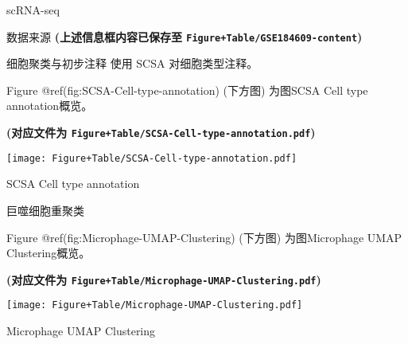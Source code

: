 \documentclass[
  ignorenonframetext,
]{beamer}
\begin{document}
\begin{frame}[fragile]{scRNA-seq}
\begin{block}{数据来源}
\textbf{(上述信息框内容已保存至
\texttt{Figure+Table/GSE184609-content})}
\end{block}

\begin{block}{细胞聚类与初步注释}
\protect\hypertarget{ux7ec6ux80deux805aux7c7bux4e0eux521dux6b65ux6ce8ux91ca}{}
使用 SCSA 对细胞类型注释。

\begin{center}\vspace{1.5cm}\end{center}

Figure @ref(fig:SCSA-Cell-type-annotation) (下方图) 为图SCSA Cell type
annotation概览。

\textbf{(对应文件为
\texttt{Figure+Table/SCSA-Cell-type-annotation.pdf})}

\def\@captype{figure}
\begin{center}
\texttt{[image: Figure+Table/SCSA-Cell-type-annotation.pdf]}
\caption{SCSA Cell type annotation}\label{fig:SCSA-Cell-type-annotation}
\end{center}

\begin{center}\vspace{1.5cm}\end{center}
\end{block}

\begin{block}{巨噬细胞重聚类}
\protect\hypertarget{ux5de8ux566cux7ec6ux80deux91cdux805aux7c7b}{}
\begin{center}\vspace{1.5cm}\end{center}

Figure @ref(fig:Microphage-UMAP-Clustering) (下方图) 为图Microphage UMAP
Clustering概览。

\textbf{(对应文件为
\texttt{Figure+Table/Microphage-UMAP-Clustering.pdf})}

\def\@captype{figure}
\begin{center}
\texttt{[image: Figure+Table/Microphage-UMAP-Clustering.pdf]}
\caption{Microphage UMAP Clustering}\label{fig:Microphage-UMAP-Clustering}
\end{center}

\begin{center}\vspace{1.5cm}\end{center}
\end{block}


\end{frame}
\end{document}
